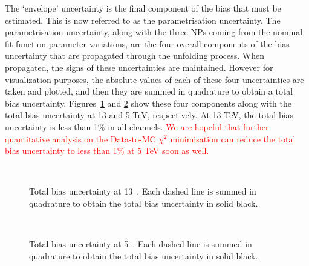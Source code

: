 The `envelope' uncertainty is the final component of the bias that must be estimated. This is now referred to as the parametrisation uncertainty. The parametrisation uncertainty, along with the three NPs coming from the nominal fit function parameter variations, are the four overall components of the bias uncertainty that are propagated through the unfolding process. When propagated, the signs of these uncertainties are maintained. However for visualization purposes, the absolute values of each of these four uncertainties are taken and plotted, and then they are summed in quadrature to obtain a total bias uncertainty. Figures~\ref{fig:Wbias_unc_tot13} and \ref{fig:Wbias_unc_tot5} show these four components along with the total bias uncertainty at 13 and 5 TeV, respectively. At 13 TeV, the total bias uncertainty is less than 1\% in all channels. \textcolor{red}{We are hopeful that further quantitative analysis on the Data-to-MC $\chi^{2}$ minimisation can reduce the total bias uncertainty to less than 1\% at 5 TeV soon as well.}

\begin{figure}[h]
  \centering
   \\
  \caption{Total bias uncertainty at 13~\TeV. Each dashed line is summed in quadrature to obtain the total bias uncertainty in solid black.}
  \label{fig:Wbias_unc_tot13}
\end{figure}

\begin{figure}[h]
  \centering
   \\
  \caption{Total bias uncertainty at 5~\TeV. Each dashed line is summed in quadrature to obtain the total bias uncertainty in solid black.}
  \label{fig:Wbias_unc_tot5}
\end{figure}
